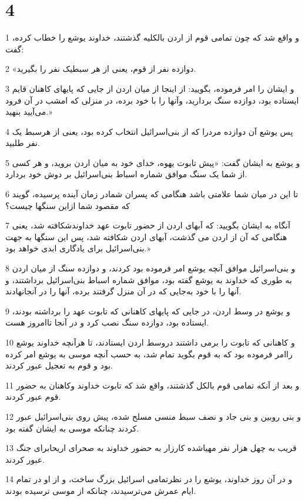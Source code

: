 \chapter{4}

\par 1 و واقع شد که چون تمامی قوم از اردن بالکلیه گذشتند، خداوند یوشع را خطاب کرده، گفت:
\par 2 «دوازده نفر از قوم، یعنی از هر سبطیک نفر را بگیرید.
\par 3 و ایشان را امر فرموده، بگویید: از اینجا از میان اردن از جایی که پایهای کاهنان قایم ایستاده بود، دوازده سنگ بردارید، وآنها را با خود برده، در منزلی که امشب در آن فرود می‌آیید بنهید.»
\par 4 پس یوشع آن دوازده مردرا که از بنی‌اسرائیل انتخاب کرده بود، یعنی از هرسبط یک نفر طلبید.
\par 5 و یوشع به ایشان گفت: «پیش تابوت یهوه، خدای خود به میان اردن بروید، و هر کسی از شما یک سنگ موافق شماره اسباط بنی‌اسرائیل بر دوش خود بردارد.
\par 6 تا این در میان شما علامتی باشد هنگامی که پسران شمادر زمان آینده پرسیده، گویند که مقصود شما ازاین سنگها چیست؟
\par 7 آنگاه به ایشان بگویید: که آبهای اردن از حضور تابوت عهد خداوندشکافته شد، یعنی هنگامی که آن از اردن می گذشت، آبهای اردن شکافته شد، پس این سنگها به جهت بنی‌اسرائیل برای یادگاری ابدی خواهد بود.»
\par 8 و بنی‌اسرائیل موافق آنچه یوشع امر فرموده بود کردند، و دوازده سنگ از میان اردن به طوری که خداوند به یوشع گفته بود، موافق شماره اسباط بنی‌اسرائیل برداشتند، و آنها را با خود به‌جایی که در آن منزل گرفتند برده، آنها را در آنجانهادند.
\par 9 و یوشع در وسط اردن، در جایی که پایهای کاهنانی که تابوت عهد را برداشته بودند، ایستاده بود، دوازده سنگ نصب کرد و در آنجا تاامروز هست.
\par 10 و کاهنانی که تابوت را برمی داشتند دروسط اردن ایستادند، تا هر‌آنچه خداوند یوشع راامر فرموده بود که به قوم بگوید تمام شد، به حسب آنچه موسی به یوشع امر کرده بود و قوم به تعجیل عبور کردند.
\par 11 و بعد از آنکه تمامی قوم بالکل گذشتند، واقع شد که تابوت خداوند وکاهنان به حضور قوم عبور کردند.
\par 12 و بنی روبین و بنی جاد و نصف سبط منسی مسلح شده، پیش روی بنی‌اسرائیل عبور کردند چنانکه موسی به ایشان گفته بود. 
\par 13 قریب به چهل هزار نفر مهیاشده کارزار به حضور خداوند به صحرای اریحابرای جنگ عبور کردند.
\par 14 و در آن روز خداوند، یوشع را در نظرتمامی اسرائیل بزرگ ساخت، و از او در تمام ایام عمرش می‌ترسیدند، چنانکه از موسی ترسیده بودند.
